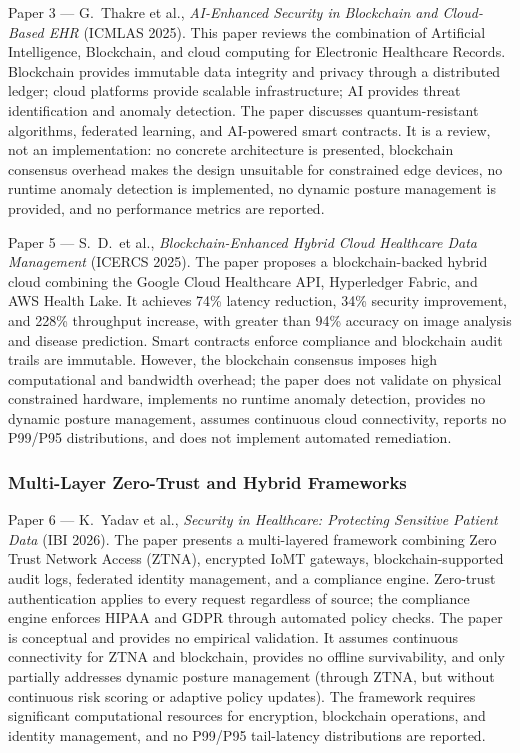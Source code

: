 {Paper 3 --- G.~Thakre et al., \textit{AI-Enhanced Security in Blockchain and Cloud-Based EHR} (ICMLAS 2025).} This paper reviews the combination of Artificial Intelligence, Blockchain, and cloud computing for Electronic Healthcare Records. Blockchain provides immutable data integrity and privacy through a distributed ledger; cloud platforms provide scalable infrastructure; AI provides threat identification and anomaly detection. The paper discusses quantum-resistant algorithms, federated learning, and AI-powered smart contracts. It is a review, not an implementation: no concrete architecture is presented, blockchain consensus overhead makes the design unsuitable for constrained edge devices, no runtime anomaly detection is implemented, no dynamic posture management is provided, and no performance metrics are reported.

{Paper 5 --- S.~D.~et al., \textit{Blockchain-Enhanced Hybrid Cloud Healthcare Data Management} (ICERCS 2025).} The paper proposes a blockchain-backed hybrid cloud combining the Google Cloud Healthcare API, Hyperledger Fabric, and AWS Health Lake. It achieves 74\% latency reduction, 34\% security improvement, and 228\% throughput increase, with greater than 94\% accuracy on image analysis and disease prediction. Smart contracts enforce compliance and blockchain audit trails are immutable. However, the blockchain consensus imposes high computational and bandwidth overhead; the paper does not validate on physical constrained hardware, implements no runtime anomaly detection, provides no dynamic posture management, assumes continuous cloud connectivity, reports no P99/P95 distributions, and does not implement automated remediation.

\subsubsection{Multi-Layer Zero-Trust and Hybrid Frameworks}

{Paper 6 --- K.~Yadav et al., \textit{Security in Healthcare: Protecting Sensitive Patient Data} (IBI 2026).} The paper presents a multi-layered framework combining Zero Trust Network Access (ZTNA), encrypted IoMT gateways, blockchain-supported audit logs, federated identity management, and a compliance engine. Zero-trust authentication applies to every request regardless of source; the compliance engine enforces HIPAA and GDPR through automated policy checks. The paper is conceptual and provides no empirical validation. It assumes continuous connectivity for ZTNA and blockchain, provides no offline survivability, and only partially addresses dynamic posture management (through ZTNA, but without continuous risk scoring or adaptive policy updates). The framework requires significant computational resources for encryption, blockchain operations, and identity management, and no P99/P95 tail-latency distributions are reported.

